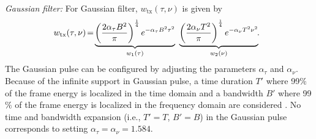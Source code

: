 {\em Gaussian filter:}
For Gaussian filter, $w_\text{tx}(\tau,\nu)$ is given by \cite{zak_otfs7}
\begin{equation}
\hspace{-2mm}
w_\text{tx}(\tau,\nu) \hspace{-0.5mm} = \hspace{-0.5mm} \underbrace{\left(\frac{2\alpha_{\tau}B^2}{\pi}\right)^{\frac{1}{4}}e^{-\alpha_{\tau}B^{2}\tau^{2}}}_{w_1(\tau)} \ \underbrace{\left(\frac{2\alpha_{\nu}T^2}{\pi}\right)^{\frac{1}{4}}e^{-\alpha_{\nu}T^{2}\nu^{2}}}_{w_2(\nu)}\hspace{-1mm}. \hspace{-0mm}
\label{eq:gauss1}
\end{equation}
The Gaussian pulse can be configured by adjusting the parameters $\alpha_{\tau}$ and $\alpha_{\nu}$. Because of the infinite support in Gaussian pulse, a time duration $T'$ where 99$\%$ of the frame energy is localized in the time domain and a bandwidth $B'$ where 99$\%$ of the frame 
energy is localized in the frequency domain are considered \cite{zak_otfs7}. No time and bandwidth expansion (i.e., $T'=T$, $B'=B$) in the Gaussian pulse corresponds to setting 
$\alpha_{\tau}=\alpha_{\nu}=1.584$. 
